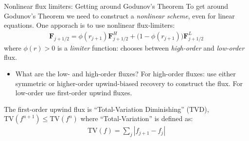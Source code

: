 \documentclass[aspectratio=169]{beamer}
\newcommand{\mypause}{}
\newcommand{\mvec}[1]{\mathbf{#1}}
\begin{document}
\begin{frame}{Nonlinear flux limiters: Getting around Godunov's Theorem}
  \small%
  To get around Godunov's Theorem we need to construct a
  \emph{nonlinear scheme}, even for linear equations. One apporach is
  to use nonlinear flux-limiters:
  \begin{align*}
    \mvec{F}_{j+1/2} = \phi(r_{j+1}) \mvec{F}^H_{j+1/2} + \big(1-\phi(r_{j+1})\big) \mvec{F}^L_{j+1/2}
  \end{align*}
  where $\phi(r)>0$ is a \emph{limiter} function: chooses between
  \emph{high-order} and \emph{low-order} flux.
  \mypause%
  \begin{itemize} 
  \item What are the low- and high-order fluxes? For high-order
    fluxes: use either symmetric or higher-order upwind-biased
    recovery to construct the flux. For low-order use first-order
    upwind fluxes.
  \end{itemize}
  \mypause%
  The first-order upwind flux is ``Total-Variation Diminishing''
  (TVD), $\textrm{TV}(f^{n+1}) \le \textrm{TV}(f^n)$ where
  ``Total-Variation'' is defined as:
  \begin{align*}
    \textrm{TV}(f) = \sum_j | f_{j+1} - f_{j} |
  \end{align*}
\end{frame}
\end{document}

